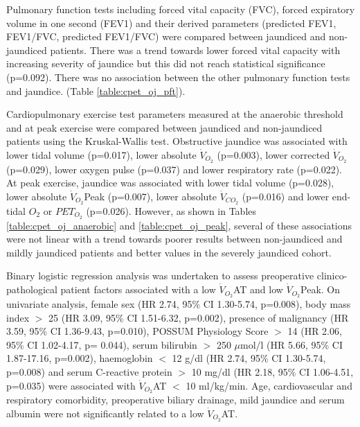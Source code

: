 


Pulmonary function tests including forced vital capacity (FVC), forced expiratory volume in one second (FEV1) and their derived parameters (predicted FEV1, FEV1/FVC, predicted FEV1/FVC) were compared between jaundiced and non-jaundiced patients. 
There was a trend towards lower forced vital capacity with increasing severity of jaundice but this did not reach statistical significance (p=0.092). 
There was no association between the other pulmonary function tests and jaundice. (Table \ref{table:cpet_oj_pft}).



Cardiopulmonary exercise test parameters measured at the anaerobic threshold and at peak exercise were compared between jaundiced and non-jaundiced patients using the Kruskal-Wallis test. 
Obstructive jaundice was associated with lower tidal volume (p=0.017), lower absolute $\dot{V}_{O_2}$ (p=0.003), lower corrected $\dot{V}_{O_2}$ (p=0.029), lower oxygen pulse (p=0.037) and lower respiratory rate (p=0.022). 
At peak exercise, jaundice was associated with lower tidal volume (p=0.028), lower absolute $\dot{V}_{O_2}$Peak (p=0.007), lower absolute $\dot{V}_{CO_2}$ (p=0.016) and lower end-tidal $O_2$ or $PET_{O_2}$ (p=0.026). 
However, as shown in Tables \ref{table:cpet_oj_anaerobic} and \ref{table:cpet_oj_peak}, several of these associations were not linear with a trend towards poorer results between non-jaundiced and mildly jaundiced patients and better values in the severely jaundiced cohort. 




Binary logistic regression analysis was undertaken to assess preoperative clinico-pathological patient factors associated with a low $\dot{V}_{O_2}$AT and low $\dot{V}_{O_2}$Peak. 
On univariate analysis, female sex (HR 2.74, 95\% CI 1.30-5.74, p=0.008), body mass index $>$ 25 (HR 3.09, 95\% CI 1.51-6.32, p=0.002), presence of malignancy (HR 3.59, 95\% CI 1.36-9.43, p=0.010), POSSUM Physiology Score $>$ 14 (HR 2.06, 95\% CI 1.02-4.17, p= 0.044), serum bilirubin $>$ 250 $\mu$mol/l (HR 5.66, 95\% CI 1.87-17.16, p=0.002), haemoglobin $<$ 12 g/dl (HR 2.74, 95\% CI 1.30-5.74, p=0.008) and serum C-reactive protein $>$ 10 mg/dl (HR 2.18, 95\% CI 1.06-4.51, p=0.035) were associated with $\dot{V}_{O_2}$AT $<$ 10 ml/kg/min. 
Age, cardiovascular and respiratory comorbidity, preoperative biliary drainage, mild jaundice and serum albumin were not significantly related to a low $\dot{V}_{O_2}$AT. 


